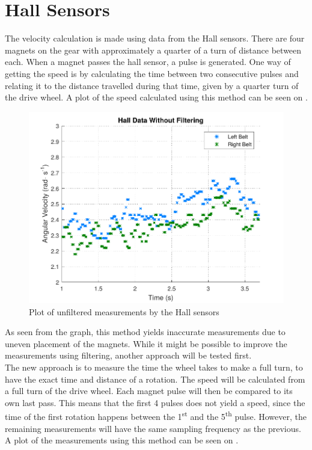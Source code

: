 \section{Hall Sensors}\label{sec:hallFiltering}

The velocity calculation is made using data from the Hall sensors. There are four magnets on the gear with approximately a quarter of a turn of distance between each. When a magnet passes the hall sensor, a pulse is generated. One way of getting the speed is by calculating the time between two consecutive pulses and relating it to the distance travelled during that time, given by a quarter turn of the drive wheel. A plot of the speed calculated using this method can be seen on .

\begin{figure}[H]
	\centering
	\includegraphics[scale=0.9]{figures/unfilteredHall.pdf}
	\caption{Plot of unfiltered measurements by the Hall sensors}
	\label{unfilteredHall}
\end{figure}\vspace{-5mm}


As seen from the graph, this method yields inaccurate measurements due to uneven placement of the magnets. While it might be possible to improve the measurements using filtering, another approach will be tested first.\\
\newpage
The new approach is to measure the time the wheel takes to make a full turn, to have the exact time and distance of a rotation. The speed will be calculated from a full turn of the drive wheel. Each magnet pulse will then be compared to its own last pass. This means that the first 4 pulses does not yield a speed, since the time of the first rotation happens between the \si{1^{st}} and the \si{5^{th}} pulse. However, the remaining measurements will have the same sampling frequency as the previous. A plot of the measurements using this method can be seen on .

